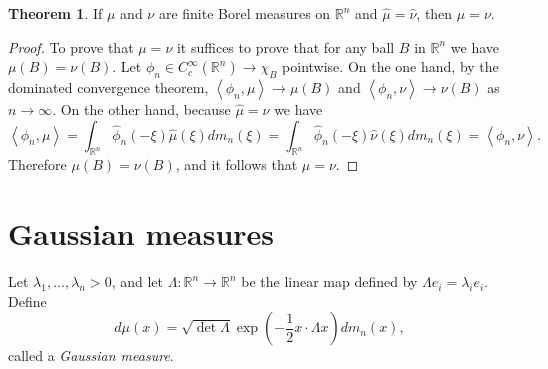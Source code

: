\documentclass{article}
\newcommand{\inner}[2]{\left\langle #1, #2 \right\rangle}
\theoremstyle{definition}
\newtheorem{theorem}{Theorem}
\theoremstyle{definition}
\begin{document}
\begin{theorem}
If $\mu$ and $\nu$ are finite Borel  measures on $\mathbb{R}^n$ and $\hat{\mu}=\hat{\nu}$, then $\mu=\nu$.
\end{theorem}
\begin{proof}
To prove that $\mu=\nu$ it suffices to prove that for any ball $B$ in $\mathbb{R}^n$ we have $\mu(B)=\nu(B)$. 
Let $\phi_n \in C_c^\infty(\mathbb{R}^n) \to \chi_B$ pointwise.  On the one hand, by the dominated convergence theorem,
$\inner{\phi_n}{\mu} \to \mu(B)$ and  $\inner{\phi_n}{\nu} \to \nu(B)$ as $n \to \infty$.
On the other hand, because $\hat{\mu}=\hat{\nu}$ we have
\[
\inner{\phi_n}{\mu}=\int_{\mathbb{R}^n} \hat{\phi}_n(-\xi) \hat{\mu}(\xi) dm_n(\xi)
=\int_{\mathbb{R}^n} \hat{\phi}_n(-\xi) \hat{\nu}(\xi) dm_n(\xi)
=\inner{\phi_n}{\nu}.
\]
Therefore $\mu(B)=\nu(B)$, and it follows that $\mu=\nu$.
\end{proof}


\section{Gaussian measures}
Let $\lambda_1,\ldots,\lambda_n>0$, and let $\Lambda:\mathbb{R}^n \to \mathbb{R}^n$ be the linear map
defined by $\Lambda e_i=\lambda_i e_i$. Define 
\[
d\mu(x) = \sqrt{\det \Lambda} \exp\left(-\frac{1}{2} x\cdot \Lambda x \right) dm_n(x),
\]
called a {\em Gaussian measure}. 
\end{document}
